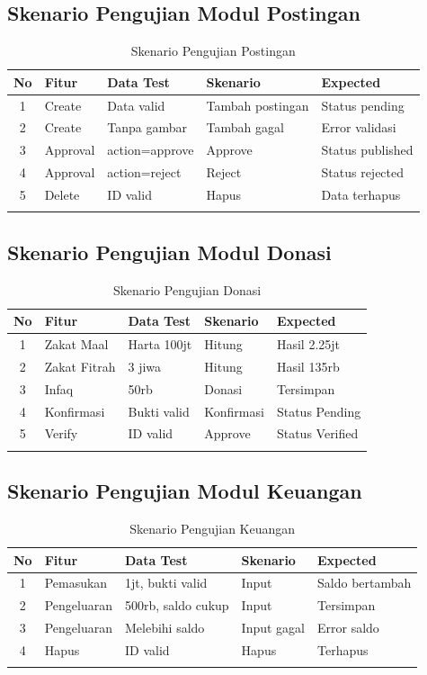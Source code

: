 \documentclass[12pt,a4paper]{article}
\begin{document}
\subsection{Skenario Pengujian Modul Postingan}
\begin{longtable}{|c|l|p{3cm}|p{3cm}|p{3cm}|}
\hline
\textbf{No} & \textbf{Fitur} & \textbf{Data Test} & \textbf{Skenario} & \textbf{Expected} \\
\hline
1 & Create & Data valid & Tambah postingan & Status pending \\
2 & Create & Tanpa gambar & Tambah gagal & Error validasi \\
3 & Approval & action=approve & Approve & Status published \\
4 & Approval & action=reject & Reject & Status rejected \\
5 & Delete & ID valid & Hapus & Data terhapus \\
\hline
\caption{Skenario Pengujian Postingan}
\end{longtable}

\subsection{Skenario Pengujian Modul Donasi}
\begin{longtable}{|c|l|p{3cm}|p{3cm}|p{3cm}|}
\hline
\textbf{No} & \textbf{Fitur} & \textbf{Data Test} & \textbf{Skenario} & \textbf{Expected} \\
\hline
1 & Zakat Maal & Harta 100jt & Hitung & Hasil 2.25jt \\
2 & Zakat Fitrah & 3 jiwa & Hitung & Hasil 135rb \\
3 & Infaq & 50rb & Donasi & Tersimpan \\
4 & Konfirmasi & Bukti valid & Konfirmasi & Status Pending \\
5 & Verify & ID valid & Approve & Status Verified \\
\hline
\caption{Skenario Pengujian Donasi}
\end{longtable}

\subsection{Skenario Pengujian Modul Keuangan}
\begin{longtable}{|c|l|p{3cm}|p{3cm}|p{3cm}|}
\hline
\textbf{No} & \textbf{Fitur} & \textbf{Data Test} & \textbf{Skenario} & \textbf{Expected} \\
\hline
1 & Pemasukan & 1jt, bukti valid & Input & Saldo bertambah \\
2 & Pengeluaran & 500rb, saldo cukup & Input & Tersimpan \\
3 & Pengeluaran & Melebihi saldo & Input gagal & Error saldo \\
4 & Hapus & ID valid & Hapus & Terhapus \\
\hline
\caption{Skenario Pengujian Keuangan}
\end{longtable}
\end{document}
